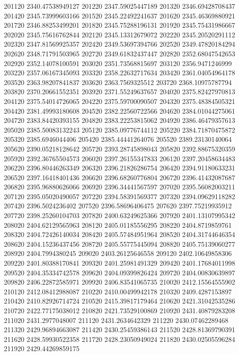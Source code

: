 {201120 2340.47538949127
201220 2347.59025447189
201320 2346.69428708437
201420 2345.73999603166
201520 2345.22492241637
201620 2345.46369880921
201720 2346.88253499201
201820 2345.75288196131
201920 2345.75431986667
202020 2345.75616762844
202120 2345.13312679072
202220 2345.20520291112
202320 2347.81569925357
202420 2349.53697394766
202520 2349.47820184294
202620 2348.71791503965
202720 2349.61832437447
202820 2352.68047542653
202920 2352.14078100591
203020 2351.73568815697
203120 2356.9471246999
203220 2357.06167345093
203320 2358.22632717634
203420 2361.04054964178
203520 2363.98207841837
203620 2363.7569325512
203720 2368.10975787794
203820 2370.20661552351
203920 2371.55249637657
204020 2375.82427970813
204120 2375.54014726065
204220 2375.59700090507
204320 2375.48384505321
204420 2381.49993180608
204520 2382.22560722566
204620 2384.01044275061
204720 2383.84420393155
204820 2383.22253815062
204920 2386.46479357613
205020 2385.50083132243
205120 2385.09776744112
205220 2384.71870475872
205320 2385.6946044406
205420 2385.44441264076
205520 2389.23130140064
205620 2390.05218128642
205720 2393.28745898043
205820 2392.88675320359
205920 2392.36765504573
206020 2397.26155347833
206120 2397.20458634483
206220 2396.80446263349
206320 2396.21826286754
206420 2394.91180633231
206520 2397.16418401436
206620 2396.68260776804
206720 2396.41432087687
206820 2395.96880626066
206920 2396.34441567597
207020 2395.56082003211
207120 2395.05020490057
207220 2394.58391569377
207320 2394.09629118282
207420 2396.5024236402
207520 2396.58696406475
207620 2397.75219935912
207720 2398.25260104703
207820 2400.63249625366
207920 2401.13107995342
208020 2404.62129565963
208120 2405.01185556295
208220 2404.8719859761
208320 2404.72426140034
208420 2405.57484951964
208520 2404.31744646354
208620 2404.15236437456
208720 2405.55775445094
208820 2405.75139060277
208920 2404.7994380245
209020 2403.26125646558
209120 2402.10649858306
209220 2401.80388170841
209320 2401.25981491329
209420 2401.17684011998
209520 2404.35334742578
209620 2404.09399826424
209720 2404.00830639897
209820 2406.22872585971
209920 2406.83541065735
210020 2412.15564555902
210120 2412.08412988087
210220 2410.00499942178
210320 2409.4287153897
210420 2410.82926714724
210520 2415.39817179464
210620 2421.31042535286
210720 2422.77175038012
210820 2421.73529100869
210920 2431.40879283208
211020 2431.2977048007
211120 2431.2634642329
211220 2430.07462289468
211320 2429.96894663087
211420 2430.25459386143
211520 2428.81369790391
211620 2428.59930522358
211720 2428.23050949024
211820 2430.02505596284
211920 2429.44269859175
}
